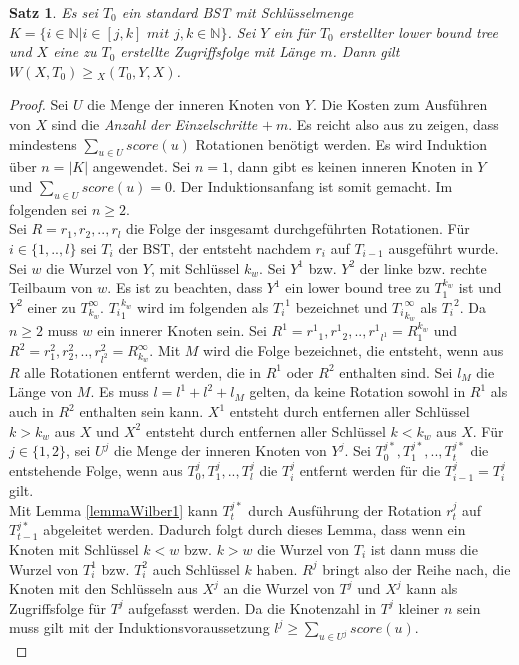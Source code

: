 \documentclass[a4paper,12pt]{article}
\newtheorem{Satz}{Satz}[section]
\begin{document}
\begin{Satz} \label{satzWilber1} Es sei $T_0$ ein standard BST mit Schlüsselmenge\\ ${K = \{  i \in \mathbb{N} \vert i \in \left[j,k\right] \textit{ mit } j,k \in  \mathbb{N} \}} $. Sei $Y$ ein für $T_0$ erstellter lower bound tree und $X$ eine zu $T_0$ erstellte Zugriffsfolge mit Länge $m$. Dann gilt\\  $W\left(X, T_0\right) \geq {_X(T_0, Y, X)} $.  
\end{Satz}
\begin{proof}
	Sei $U$ die Menge der inneren Knoten von $Y$. Die Kosten zum Ausführen von $X$ sind die \textit{Anzahl der Einzelschritte} $ +~m$. Es reicht also aus zu zeigen, dass mindestens $\sum_{u \in U} {\mathit{score}} \left(u\right)$ Rotationen benötigt werden. Es wird Induktion über  $n = \vert K \vert$ angewendet. Sei $n = 1$, dann gibt es keinen inneren Knoten in $Y$ und $\sum_{u \in U} {\mathit{score}} \left(u\right) = 0$. Der Induktionsanfang ist somit gemacht. Im folgenden sei $n \geq 2$.\\
	Sei $R = r_1,r_2,..,r_l$ die Folge der insgesamt durchgeführten Rotationen. Für $i \in \{1,..,l\}$ sei $T_i$ der BST, der entsteht nachdem $r_i$ auf $T_{i-1}$ ausgeführt wurde. Sei $w$ die Wurzel von $Y$, mit Schlüssel $k_w$. Sei $Y^1$ bzw. $Y^2$ der linke bzw. rechte Teilbaum von $w$. Es ist zu beachten, dass $Y^1$ ein lower bound tree zu $T_{1}^{k_w}$ ist und  $Y^2$ einer zu $T^\infty_{k_w}$. ${T_{i}}_1^{k_w}$ wird im folgenden als ${T_i}^1$ bezeichnet und ${T_{i}}_{k_w}^{\infty}$ als ${T_i}^2$. Da $n \geq 2$ muss $w$ ein innerer Knoten sein. Sei  $R^1 = {r^1}_1,{r^1}_2,..,{r^1}_{l^1} = R^{k_w}_1$ und $R^2 = r^2_1,r^2_2,..,r^2_{l^2} = R^\infty_{k_w}$. Mit $M$ wird die Folge bezeichnet, die entsteht, wenn aus $R$ alle Rotationen entfernt werden, die in $R^1$ oder $R^2$ enthalten sind. Sei $l_M$ die Länge von $M$. Es muss $l = l^1 + l^2 + l_M$ gelten, da keine Rotation sowohl in $R^1$ als auch in $R^2$ enthalten sein kann. $X^1$ entsteht durch entfernen aller Schlüssel $k > k_w$ aus $X$ und  $X^2$ entsteht durch entfernen aller Schlüssel $k < k_w$ aus $X$. Für $j \in \{1,2\}$, sei $U^j$ die Menge der inneren Knoten von $Y^j$. Sei $T^{j*}_0,T^{j*}_1,..,T^{j*}_{t}$ die entstehende Folge, wenn aus $T^{j}_0,T^{j}_1,..,T^{j}_{l}$ die $T^j_i$ entfernt werden für die $T^j_{i-1} = T^j_i$ gilt.\\ Mit Lemma \ref{lemmaWilber1} kann  $T^{j*}_{t}$ durch Ausführung der Rotation $r^j_t$ auf $T^{j*}_{t-1}$ abgeleitet werden. Dadurch folgt durch dieses Lemma, dass wenn ein Knoten mit Schlüssel $k < w$ bzw. $k > w$ die Wurzel von $T_i$ ist dann muss die Wurzel von $T^1_i$ bzw. $T^2_i$ auch Schlüssel $k$ haben. $R^j$ bringt also der Reihe nach, die Knoten mit den Schlüsseln aus $X^j$ an die Wurzel von $T^j$ und  $X^j$ kann als Zugriffsfolge für $T^j$ aufgefasst werden. Da die Knotenzahl in $T^j$ kleiner $n$ sein muss gilt mit der Induktionsvoraussetzung  $l^j \geq \sum_{u \in U^j} {\mathit{score}} (u)$.\\

\end{proof}
\end{document}
